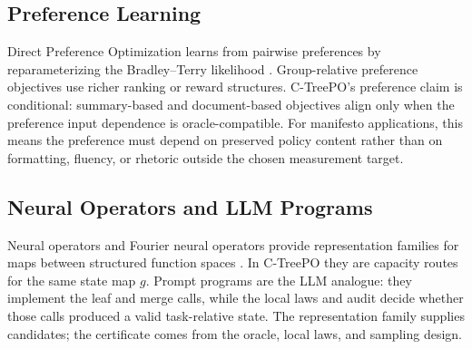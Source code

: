 \subsection{Preference Learning}

Direct Preference Optimization learns from pairwise preferences by
reparameterizing the Bradley--Terry likelihood
\citep{BradleyTerry1952,RafailovEtAl2023DPO}. Group-relative preference
objectives use richer ranking or reward structures. C-TreePO's preference
claim is conditional: summary-based and document-based objectives align only
when the preference input dependence is oracle-compatible. For manifesto
applications, this means the preference must depend on preserved policy
content rather than on formatting, fluency, or rhetoric outside the chosen
measurement target.

\subsection{Neural Operators and LLM Programs}

Neural operators and Fourier neural operators provide representation families
for maps between structured function spaces
\citep{Kovachki23NeuralOperator,Li21FNO}. In C-TreePO they are capacity
routes for the same state map \(g\). Prompt programs are the LLM analogue:
they implement the leaf and merge calls, while the local laws and audit decide
whether those calls produced a valid task-relative state. The representation
family supplies candidates; the certificate comes from the oracle, local laws,
and sampling design.

